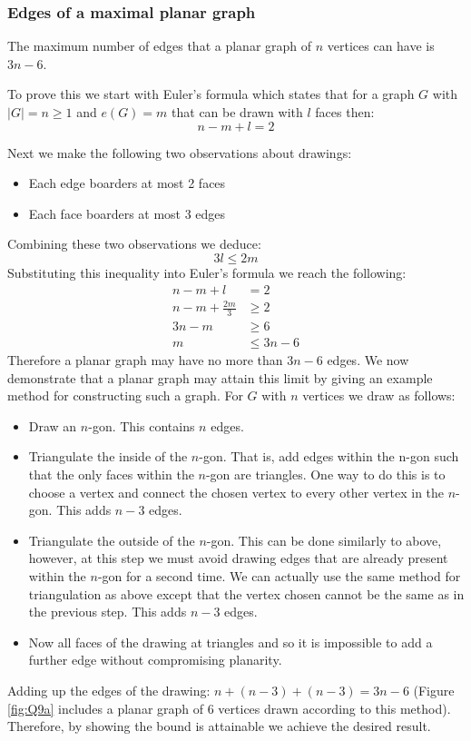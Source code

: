 \documentclass[a4paper]{article}
\begin{document}
\subsubsection*{Edges of a maximal planar graph}
The maximum number of edges that a planar graph of $n$ vertices can have is $3n-6$.

\bigskip 
To prove this we start with Euler's formula which states that for a graph $G$ with $|G|=n\geq1$ and $e(G)=m$ that can be drawn with $l$ faces then:
\[ n-m+l=2 \]

Next we make the following two observations about drawings:
\begin{itemize}
    \item Each edge boarders at most 2 faces
    \item Each face boarders at most 3 edges
\end{itemize}
Combining these two observations we deduce:
\[ 3l \leq 2m \]
Substituting this inequality into Euler's formula we reach the following:
\begin{align*}
    n-m+l &= 2 \\
    n-m+\frac{2m}{3} &\geq 2 \\
    3n-m &\geq 6 \\
    m &\leq 3n-6
\end{align*}
Therefore a planar graph may have no more than $3n-6$ edges. We now demonstrate that a planar graph may attain this limit by giving an example method for constructing such a graph. For $G$ with $n$ vertices we draw as follows:
\begin{itemize}
    \item Draw an $n$-gon. This contains $n$ edges.
    \item Triangulate the inside of the $n$-gon. That is, add edges within the n-gon such that the only faces within the $n$-gon are triangles. One way to do this is to choose a vertex and connect the chosen vertex to every other vertex in the $n$-gon. This adds $n-3$ edges.
    \item Triangulate the outside of the $n$-gon. This can be done similarly to above, however, at this step we must avoid drawing edges that are already present within the $n$-gon for a second time. We can actually use the same method for triangulation as above except that the vertex chosen cannot be the same as in the previous step. This adds $n-3$ edges.
    \item Now all faces of the drawing at triangles and so it is impossible to add a further edge without compromising planarity.
\end{itemize}
Adding up the edges of the drawing: $n + (n-3) + (n-3) = 3n-6$ (Figure \ref{fig:Q9a} includes a planar graph of 6 vertices drawn according to this method). Therefore, by showing the bound is attainable we achieve the desired result.
\end{document}
